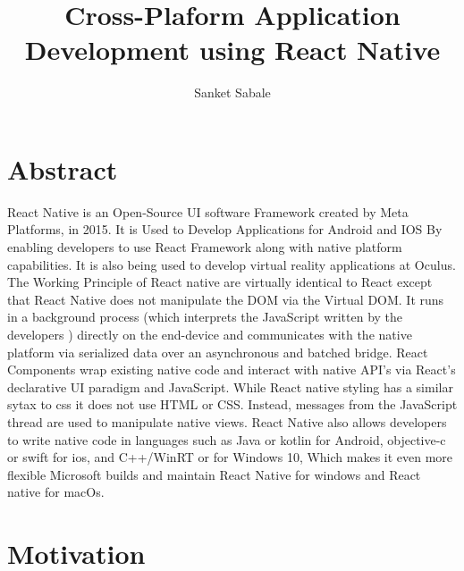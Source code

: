 \documentclass[12pt,a4paper]{article}
\title{Cross-Plaform Application Development using React Native}
\author{ Sanket Sabale }
\begin{document}
\maketitle
\newpage
\tableofcontents
\newpage




\section*{Abstract}

 React Native is an Open-Source UI software Framework created by Meta Platforms, in 2015. It is Used to Develop Applications for Android and IOS By enabling developers to use React Framework along with native platform capabilities. It is also being used to develop virtual reality applications at Oculus. The Working Principle of React native are virtually identical to React except that React Native does not manipulate the DOM via the Virtual DOM. It runs in a background process (which  interprets the JavaScript written by the developers ) directly on the end-device and communicates with the native platform via serialized data over an asynchronous and batched bridge. React Components wrap existing native code and interact with native API’s via React’s declarative UI paradigm and JavaScript. While React native styling has a similar sytax to css it does not use HTML or CSS. Instead, messages from the JavaScript thread are used to manipulate native views. React Native also allows developers to write native code in languages such as Java or kotlin for Android, objective-c or swift for ios, and C++/WinRT or  for Windows 10, Which makes it even more flexible Microsoft builds and maintain React Native for windows and React native for macOs.


\newpage

\section*{Motivation}
\end{document}
